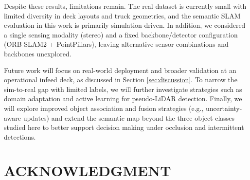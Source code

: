\documentclass[letterpaper, 10 pt, conference]{IEEEtran}  %
\begin{document}
Despite these results, limitations remain. The real dataset is currently small with limited diversity in deck layouts and truck geometries, and the semantic SLAM evaluation in this work is primarily simulation-driven. In addition, we considered a single sensing modality (stereo) and a fixed backbone/detector configuration (ORB-SLAM2 + PointPillars), leaving alternative sensor combinations and backbones unexplored.

Future work will focus on real-world deployment and broader validation at an operational infeed deck, as discussed in Section \ref{sec:discussion}. To narrow the sim-to-real gap with limited labels, we will further investigate strategies such as domain adaptation and active learning for pseudo-LiDAR detection. Finally, we will explore improved object association and fusion strategies (e.g., uncertainty-aware updates) and extend the semantic map beyond the three object classes studied here to better support decision making under occlusion and intermittent detections.


\section*{ACKNOWLEDGMENT}
\end{document}
